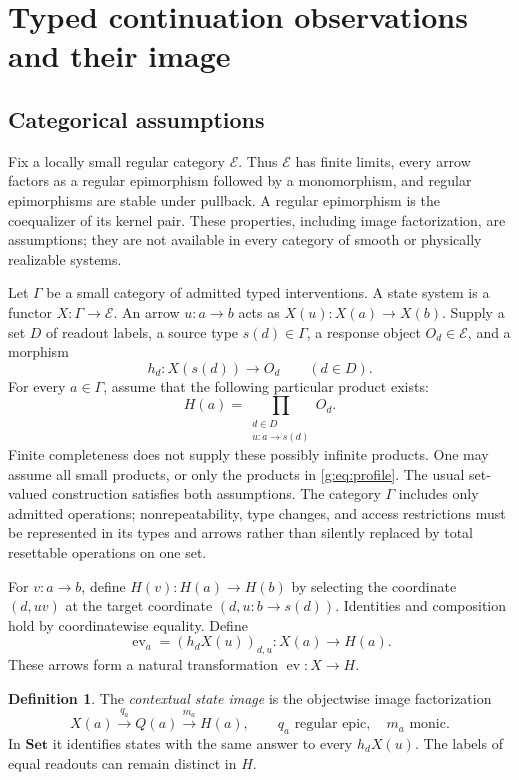 \documentclass[11pt]{article}
\theoremstyle{definition}
\newtheorem{definition}[theorem]{Definition}
\theoremstyle{remark}\newtheorem{remark}[theorem]{Remark}
\newcommand{\E}{\mathcal E}
\newcommand{\ev}{\operatorname{ev}}
\begin{document}
\section{Typed continuation observations and their image}\label{g:sec:typed}
\subsection{Categorical assumptions}
Fix a locally small regular category $\E$. Thus $\E$ has finite limits,
every arrow factors as a regular epimorphism followed by a monomorphism,
and regular epimorphisms are stable under pullback. A regular epimorphism
is the coequalizer of its kernel pair. These properties, including image
factorization, are assumptions; they are not available in every category
of smooth or physically realizable systems.

Let $\Gamma$ be a small category of admitted typed interventions. A state
system is a functor $X:\Gamma\to\E$. An arrow $u:a\to b$ acts as
$X(u):X(a)\to X(b)$. Supply a set $D$ of readout labels, a source type
$s(d)\in\Gamma$, a response object $O_d\in\E$, and a morphism
\[
 h_d:X(s(d))\longrightarrow O_d\qquad(d\in D).
\]
For every $a\in\Gamma$, assume that the following particular product exists:
\begin{equation}\label{g:eq:profile}
 H(a)=\prod_{\substack{d\in D\\u:a\to s(d)}}O_d.
\end{equation}
Finite completeness does not supply these possibly infinite products.
One may assume all small products, or only the products in
\eqref{g:eq:profile}. The usual set-valued construction satisfies both
assumptions. The category $\Gamma$ includes only admitted operations;
nonrepeatability, type changes, and access restrictions must be represented
in its types and arrows rather than silently replaced by total resettable
operations on one set.

For $v:a\to b$, define $H(v):H(a)\to H(b)$ by selecting the coordinate
$(d,uv)$ at the target coordinate $(d,u:b\to s(d))$. Identities and
composition hold by coordinatewise equality. Define
\begin{equation}\label{g:eq:ev}
 \ev_a=(h_dX(u))_{d,u}:X(a)\longrightarrow H(a).
\end{equation}
These arrows form a natural transformation $\ev:X\to H$.

\begin{definition}
The \emph{contextual state image} is the objectwise image factorization
\begin{equation}\label{g:eq:quotient}
 X(a)\xrightarrow{q_a}Q(a)\xrightarrow{m_a}H(a),\qquad
 q_a\text{ regular epic},\quad m_a\text{ monic}.
\end{equation}
In $\mathbf{Set}$ it identifies states with the same answer to every
$h_dX(u)$. The labels of equal readouts can remain distinct in $H$.
\end{definition}
\end{document}
